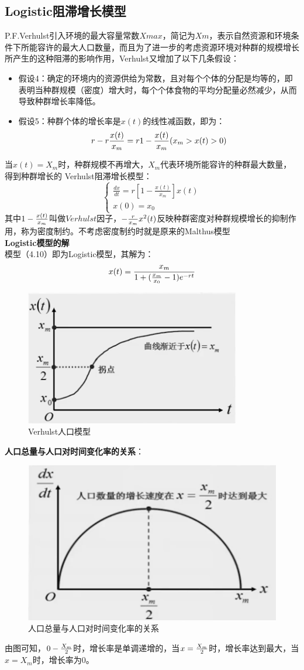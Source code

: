 \documentclass[openany]{progbookcn}
\begin{document}
\subsection{Logistic阻滞增长模型}
\indent P.F.Verhulst引入环境的最大容量常数$Xmax$，简记为$Xm$，表示自然资源和环境条件下所能容许的最大人口数量，而且为了进一步的考虑资源环境对种群的规模增长所产生的这种阻滞的影响作用，Verhulst又增加了以下几条假设：
\begin{itemize}
\item{假设4}：确定的环境内的资源供给为常数，且对每个个体的分配是均等的，即表明当种群规模（密度）增大时，每个个体食物的平均分配量必然减少，从而导致种群增长率降低。
\item{假设5}：种群个体的增长率是$x(t)$的线性减函数，即为：
\begin{equation}
r-r{{x(t)}\over{x_m}}=r{1-{x(t)\over{x_m}}}(x_m>x(t)>0)
\end{equation}
\end{itemize}
\indent 当$x(t)=X_m$时，种群规模不再增大，$X_m$代表环境所能容许的种群最大数量，得到种群增长的 Verhulst阻滞增长模型：
\begin{equation}
\begin{cases}
\frac{{dx}}{{dt}} = r\left[ {1 - \frac{{x(t)}}{{{x_m}}}} \right]x(t)\\
x(0)=x_0
\end{cases}
\end{equation}
\indent 其中$1-{{x(t)}\over {x_m}}$叫做$Verhulst$因子，$-{r\over{x_m}}x^2{(t)}$反映种群密度对种群规模增长的抑制作用，称为密度制约。不考虑密度制约时就是原来的Malthus模型\\
\noindent\textbf{Logistic模型的解}\\
\indent 模型（4.10）即为Logistic模型，其解为：
\begin{equation}
x(t)={{x_m}\over{1+({{x_m}\over{x_0}}-1)e^{-rt}}}
\end{equation}
\begin{figure}[H]
\centering
\includegraphics[width=0.45 \textwidth]{figs/chapter4/Verhulst人口模型}
\caption{Verhulst人口模型}
\end{figure}
\noindent\textbf{人口总量与人口对时间变化率的关系}：
\begin{figure}[H]
\centering
\includegraphics[width=0.45 \textwidth]{figs/chapter4/人口总量与人口对时间变化率的关系}
\caption{人口总量与人口对时间变化率的关系}
\end{figure}
\indent 由图可知，$0-{{X_m}\over 2}$时，增长率是单调递增的，当$x={{X_m}\over 2}$时，增长率达到最大，当$x=X_m$时，增长率为$0$。
\end{document}
